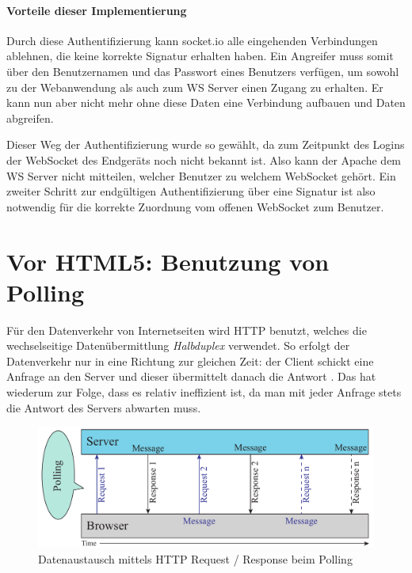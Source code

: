 \paragraph{Vorteile dieser Implementierung}
Durch diese Authentifizierung kann socket.io alle eingehenden Verbindungen ablehnen, die keine korrekte Signatur erhalten haben. Ein Angreifer muss somit über den Benutzernamen und das Passwort eines Benutzers verfügen, um sowohl zu der Webanwendung als auch zum WS Server einen Zugang zu erhalten. Er kann nun aber nicht mehr ohne diese Daten eine Verbindung aufbauen und Daten abgreifen.\par

Dieser Weg der Authentifizierung wurde so gewählt, da zum Zeitpunkt des Logins der WebSocket des Endgeräts noch nicht bekannt ist. Also kann der Apache dem WS Server nicht mitteilen, welcher Benutzer zu welchem WebSocket gehört. Ein zweiter Schritt zur endgültigen Authentifizierung über eine Signatur ist also notwendig für die korrekte Zuordnung vom offenen WebSocket zum Benutzer. 

\section{Vor HTML5: Benutzung von Polling}
Für den Datenverkehr von Internetseiten wird HTTP benutzt, welches die wechselseitige Datenübermittlung \emph{Halbduplex} verwendet. So erfolgt der Datenverkehr nur in eine Richtung zur gleichen Zeit: der Client schickt eine Anfrage an den Server und dieser übermittelt danach die Antwort \cite[S. 5]{ws}. Das hat wiederum zur Folge, dass es relativ ineffizient ist, da man mit jeder Anfrage stets die Antwort des Servers abwarten muss.\par

\begin{figure}[!ht]
	\centering
	\includegraphics[width=15cm]{fig/polling}
	\caption[Datenaustausch beim Polling]{Datenaustausch mittels HTTP Request / Response beim Polling {\cite[S. 7]{ws}}}
\end{figure}

